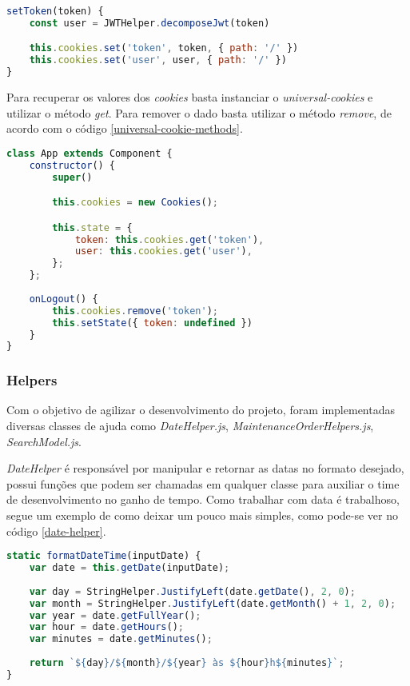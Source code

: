 \begin{lstlisting}[language=JavaScript, caption={Gravar dados no cookie}, label={storage-cookie-data}]
setToken(token) {
	const user = JWTHelper.decomposeJwt(token)

	this.cookies.set('token', token, { path: '/' })
	this.cookies.set('user', user, { path: '/' })
}
\end{lstlisting}

Para recuperar os valores dos \textit{cookies} basta instanciar o \textit{universal-cookies} e utilizar o método \textit{get}. Para remover o dado basta utilizar o método \textit{remove}, de acordo com o código \ref{universal-cookie-methods}.

\begin{lstlisting}[language=JavaScript, caption={Recuperar dados do cookie}, label={universal-cookie-methods}]
class App extends Component {
	constructor() {
		super()

		this.cookies = new Cookies();

		this.state = { 
			token: this.cookies.get('token'),
			user: this.cookies.get('user'),
		};
	};
	
	onLogout() {
		this.cookies.remove('token');
		this.setState({ token: undefined })
	}
}
\end{lstlisting}

\subsubsection{Helpers}
Com o objetivo de agilizar o desenvolvimento do projeto, foram implementadas diversas classes de ajuda como \textit{DateHelper.js}, \textit{MaintenanceOrderHelpers.js}, \textit{SearchModel.js}.

\textit{DateHelper} é responsável por manipular e retornar as datas no formato desejado, possui funções que podem ser chamadas em qualquer classe para auxiliar o time de desenvolvimento no ganho de tempo. Como trabalhar com data é trabalhoso, segue um exemplo de como deixar um pouco mais simples, como pode-se ver no código \ref{date-helper}.

\begin{lstlisting}[language=JavaScript, caption={Função que formata a data em dia/mês/ano - horas/minutos}, label={date-helper}]
static formatDateTime(inputDate) {
	var date = this.getDate(inputDate);
	
	var day = StringHelper.JustifyLeft(date.getDate(), 2, 0);
	var month = StringHelper.JustifyLeft(date.getMonth() + 1, 2, 0);
	var year = date.getFullYear();
	var hour = date.getHours();
	var minutes = date.getMinutes();
	
	return `${day}/${month}/${year} às ${hour}h${minutes}`;
}
\end{lstlisting}

